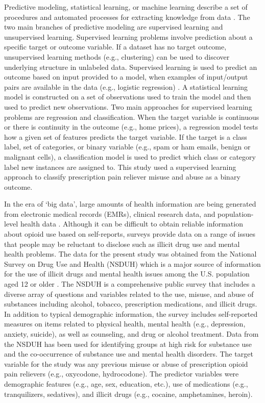 \documentclass[sigconf]{acmart}
\begin{document}
Predictive modeling, statistical learning, or machine learning describe a 
set of procedures and automated processes for extracting knowledge from data 
\cite{james13, kuhn13, muller17, raschka17}. The two main branches of 
predictive modeling are supervised learning and unsupervised learning. 
Supervised learning problems involve prediction about a specific target 
or outcome variable. If a dataset has no target outcome, unsupervised learning 
methods (e.g., clustering) can be used to discover underlying structure 
in unlabeled data. Supervised learning is used to predict an outcome based
on input provided to a model, when examples of input/output pairs are available 
in the data (e.g., logistic regression) \cite{muller17}. A statistical learning 
model is constructed on a set of observations used to train the model and 
then used to predict new observations. Two main approaches for supervised 
learning problems are regression and classification. When the target variable
is continuous or there is continuity in the outcome (e.g., home prices), a
regression model tests how a given set of features predicts the target variable. 
If the target is a class label, set of categories, or binary variable (e.g., 
spam or ham emails, benign or malignant cells), a classification model is used 
to predict which class or category label new instances are assigned to. 
This study used a supervised learning approach to classify prescription pain 
reliever misuse and abuse as a binary outcome. 


In the era of `big data', large amounts of health information are being 
generated from electronic medical records (EMRs), clinical research data, and 
population-level health data \cite{herland14}. Although it can be difficult 
to obtain reliable information about opioid use based on self-reports, surveys 
provide data on a range of issues that people may be reluctant to disclose 
such as illicit drug use and mental health problems. The data for the present 
study was obtained from the National Survey on Drug Use and Health (NSDUH) 
which is a major source of information for the use of illicit drugs and mental 
health issues among the U.S. population aged 12 or older \cite{samhsa18}. 
The NSDUH is a comprehensive public survey that includes a diverse array 
of questions and variables related to the use, misuse, and abuse of substances 
including alcohol, tobacco, prescription medications, and illicit drugs. In 
addition to typical demographic information, the survey includes self-reported
measures on items related to physical health, mental health (e.g., depression, 
anxiety, suicide), as well as counseling, and drug or alcohol treatment. Data 
from the NSDUH has been used for identifying groups at high risk for substance 
use and the co-occurrence of substance use and mental health disorders. The 
target variable for the study was any previous misuse or abuse of prescription 
opioid pain relievers (e.g., oxycodone, hydrocodone). The predictor variables 
were demographic features (e.g., age, sex, education, etc.), use of medications 
(e.g., tranquilizers, sedatives), and illicit drugs (e.g., cocaine, 
amphetamines, heroin). 
\end{document}
